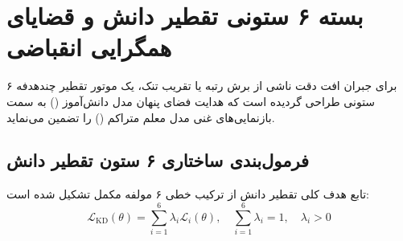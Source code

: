 \documentclass[12pt,a4paper]{report}
\theoremstyle{definition}
\begin{document}
\section{بسته ۶ ستونی تقطیر دانش و قضایای همگرایی انقباضی }
\label{sec:six_pillar_distillation}
برای جبران افت دقت ناشی از برش رتبه یا تقریب تنک، یک موتور تقطیر چندهدفه ۶ ستونی طراحی گردیده است که هدایت فضای پنهان مدل دانش‌آموز () به سمت بازنمایی‌های غنی مدل معلم متراکم () را تضمین می‌نماید.

\subsection{فرمول‌بندی ساختاری ۶ ستون تقطیر دانش}
تابع هدف کلی تقطیر دانش از ترکیب خطی ۶ مولفه مکمل تشکیل شده است:
\begin{equation}
    \mathcal{L}_{\text{KD}}(\theta) = \sum_{i=1}^6 \lambda_i \mathcal{L}_i(\theta), \quad \sum_{i=1}^6 \lambda_i = 1, \quad \lambda_i > 0
\end{equation}
\end{document}
